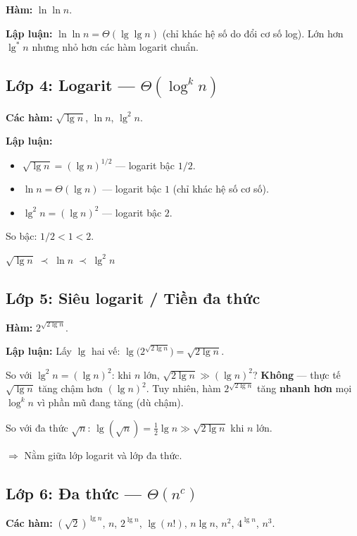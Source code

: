 ﻿\documentclass[12pt,a4paper]{article}
\begin{document}
\textbf{Hàm:} $\ln\ln n$.

\textbf{Lập luận:} $\ln\ln n = \Theta(\lg\lg n)$ (chỉ khác hệ số do đổi cơ số log).
Lớn hơn $\lg^* n$ nhưng nhỏ hơn các hàm logarit chuẩn.

\subsection{Lớp 4: Logarit --- $\Theta(\log^k n)$}

\textbf{Các hàm:} $\sqrt{\lg n}$, \;\; $\ln n$, \;\; $\lg^2 n$.

\textbf{Lập luận:}
\begin{itemize}
  \item $\sqrt{\lg n} = (\lg n)^{1/2}$ --- logarit bậc $1/2$.
  \item $\ln n = \Theta(\lg n)$ --- logarit bậc $1$ (chỉ khác hệ số cơ số).
  \item $\lg^2 n = (\lg n)^2$ --- logarit bậc $2$.
\end{itemize}
So bậc: $1/2 < 1 < 2$.

\begin{resultbox}
$\sqrt{\lg n} \;\prec\; \ln n \;\prec\; \lg^2 n$
\end{resultbox}

\subsection{Lớp 5: Siêu logarit / Tiền đa thức}

\textbf{Hàm:} $2^{\sqrt{2\lg n}}$.

\textbf{Lập luận:} Lấy $\lg$ hai vế: $\lg\bigl(2^{\sqrt{2\lg n}}\bigr) = \sqrt{2\lg n}$.

So với $\lg^2 n = (\lg n)^2$: khi $n$ lớn, $\sqrt{2\lg n} \gg (\lg n)^2$? \textbf{Không} ---
thực tế $\sqrt{\lg n}$ tăng chậm hơn $(\lg n)^2$. Tuy nhiên, hàm $2^{\sqrt{2\lg n}}$ tăng
\textbf{nhanh hơn} mọi $\log^k n$ vì phần mũ đang tăng (dù chậm).

So với đa thức $\sqrt{n}$: $\lg(\sqrt{n}) = \frac{1}{2}\lg n \gg \sqrt{2\lg n}$ khi $n$ lớn.

$\Longrightarrow$ Nằm giữa lớp logarit và lớp đa thức.

\subsection{Lớp 6: Đa thức --- $\Theta(n^c)$}

\textbf{Các hàm:} $(\sqrt{2})^{\lg n}$, \; $n$, \; $2^{\lg n}$, \; $\lg(n!)$, \; $n\lg n$, \; $n^2$, \; $4^{\lg n}$, \; $n^3$.
\end{document}
